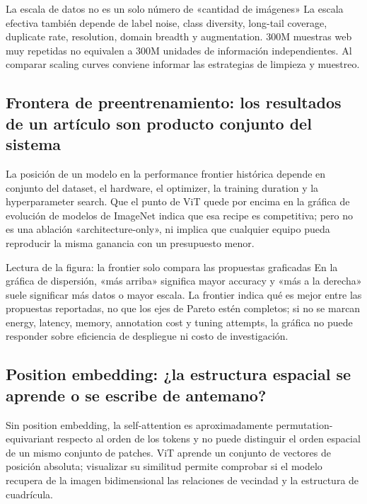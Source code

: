 \begin{warningbox}{La escala de datos no es un solo número de «cantidad de imágenes»}
La escala efectiva también depende de label noise, class diversity, long-tail coverage, duplicate rate, resolution, domain breadth y augmentation. 300M muestras web muy repetidas no equivalen a 300M unidades de información independientes. Al comparar scaling curves conviene informar las estrategias de limpieza y muestreo.
\end{warningbox}

\subsection{Frontera de preentrenamiento: los resultados de un artículo son producto conjunto del sistema}

La posición de un modelo en la performance frontier histórica depende en conjunto del dataset, el hardware, el optimizer, la training duration y la hyperparameter search. Que el punto de ViT quede por encima en la gráfica de evolución de modelos de ImageNet indica que esa recipe es competitiva; pero no es una ablación «architecture-only», ni implica que cualquier equipo pueda reproducir la misma ganancia con un presupuesto menor.


\begin{knowledgebox}{Lectura de la figura: la frontier solo compara las propuestas graficadas}
En la gráfica de dispersión, «más arriba» significa mayor accuracy y «más a la derecha» suele significar más datos o mayor escala. La frontier indica qué es mejor entre las propuestas reportadas, no que los ejes de Pareto estén completos; si no se marcan energy, latency, memory, annotation cost y tuning attempts, la gráfica no puede responder sobre eficiencia de despliegue ni costo de investigación.
\end{knowledgebox}

\subsection{Position embedding: ¿la estructura espacial se aprende o se escribe de antemano?}

Sin position embedding, la self-attention es aproximadamente permutation-equivariant respecto al orden de los tokens y no puede distinguir el orden espacial de un mismo conjunto de patches. ViT aprende un conjunto de vectores de posición absoluta; visualizar su similitud permite comprobar si el modelo recupera de la imagen bidimensional las relaciones de vecindad y la estructura de cuadrícula.

